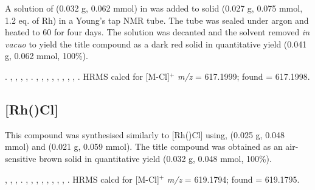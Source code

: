 A solution of \tBusixantphos{} (0.032 g, 0.062 mmol) in  was added to solid \ce{[Rh(COE)2Cl]} (0.027 g, 0.075 mmol, 1.2 eq. of Rh) in a Young's tap NMR tube.  The tube was sealed under argon and heated to 60 \degC{} for four days.  The solution was decanted and the solvent removed \emph{in vacuo} to yield the title compound as a dark red solid in quantitative yield (0.041 g, 0.062 mmol, 100\%).

.
,
,
,
,
.
,
,
,
,
,
,
,
,
.
HRMS calcd for  [M-Cl]$^+$ \emph{m/z} = 617.1999; found = 617.1998.



\subsection*{[Rh(\tButhixantphosk)Cl]}


This compound was synthesised similarly to [Rh(\tBusixantphos)Cl] using, \tButhixantphos{} (0.025 g, 0.048 mmol) and  (0.021 g, 0.059 mmol).  The title compound was obtained as an air-sensitive brown solid in quantitative yield (0.032 g, 0.048 mmol, 100\%).  

,
,
,
.
,
,
,
,
,
,
,
,
.
HRMS calcd for  [M-Cl]$^+$ \emph{m/z} = 619.1794; found = 619.1795.


